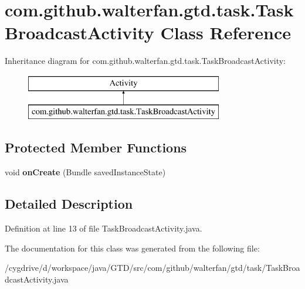 \hypertarget{classcom_1_1github_1_1walterfan_1_1gtd_1_1task_1_1TaskBroadcastActivity}{\section{com.\-github.\-walterfan.\-gtd.\-task.\-Task\-Broadcast\-Activity Class Reference}
\label{classcom_1_1github_1_1walterfan_1_1gtd_1_1task_1_1TaskBroadcastActivity}
}
Inheritance diagram for com.\-github.\-walterfan.\-gtd.\-task.\-Task\-Broadcast\-Activity\-:\begin{figure}[H]
\begin{center}
\leavevmode
\includegraphics[height=2.000000cm]{classcom_1_1github_1_1walterfan_1_1gtd_1_1task_1_1TaskBroadcastActivity}
\end{center}
\end{figure}
\subsection*{Protected Member Functions}
\begin{DoxyCompactItemize}
\item 
\hypertarget{classcom_1_1github_1_1walterfan_1_1gtd_1_1task_1_1TaskBroadcastActivity_af1b8c2214d6c4fb6c2c371cb0a7a2453}{void {\bfseries on\-Create} (Bundle saved\-Instance\-State)}\label{classcom_1_1github_1_1walterfan_1_1gtd_1_1task_1_1TaskBroadcastActivity_af1b8c2214d6c4fb6c2c371cb0a7a2453}

\end{DoxyCompactItemize}


\subsection{Detailed Description}


Definition at line 13 of file Task\-Broadcast\-Activity.\-java.



The documentation for this class was generated from the following file\-:\begin{DoxyCompactItemize}
\item 
/cygdrive/d/workspace/java/\-G\-T\-D/src/com/github/walterfan/gtd/task/Task\-Broadcast\-Activity.\-java\end{DoxyCompactItemize}
